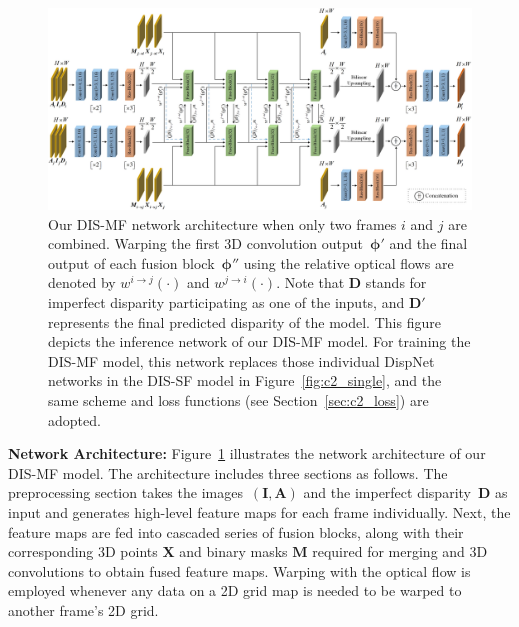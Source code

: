 \begin{figure}[t]
    \begin{center}
        \includegraphics[width=1.0\linewidth]{images/chapter2/figures/Fig3.jpg}
    \end{center}
   \caption{Our DIS-MF network architecture when only two frames $i$ and $j$ are combined. Warping the first 3D convolution output~$\boldsymbol{\phi'}$ and the final output of each fusion block~$\boldsymbol{\phi''}$ using the relative optical flows are denoted by $w^{i \rightarrow j}(\cdot)$ and $w^{j \rightarrow i}(\cdot)$. Note that $\boldsymbol{D}$ stands for imperfect disparity participating as one of the inputs, and $\boldsymbol{D'}$ represents the final predicted disparity of the model. This figure depicts the inference network of our DIS-MF model. For training the DIS-MF model, this network replaces those individual DispNet~\citep{mayer2016large} networks in the DIS-SF model in Figure~\ref{fig:c2_single}, and the same scheme and loss functions (see Section~\ref{sec:c2_loss}) are adopted.}
    \label{fig:c2_architecture}
\end{figure}

\bigbreak\noindent\textbf{Network Architecture:} Figure~\ref{fig:c2_architecture} illustrates the network architecture of our DIS-MF model. The architecture includes three sections as follows. The preprocessing section takes the images~$(\boldsymbol{I},\boldsymbol{A})$ and the imperfect disparity~$\boldsymbol{D}$ as input and generates high-level feature maps for each frame individually. Next, the feature maps are fed into cascaded series of fusion blocks, along with their corresponding 3D points $\boldsymbol{X}$ and binary masks $\boldsymbol{M}$ required for merging and 3D convolutions to obtain fused feature maps. Warping with the optical flow is employed whenever any data on a 2D grid map is needed to be warped to another frame's 2D grid.

